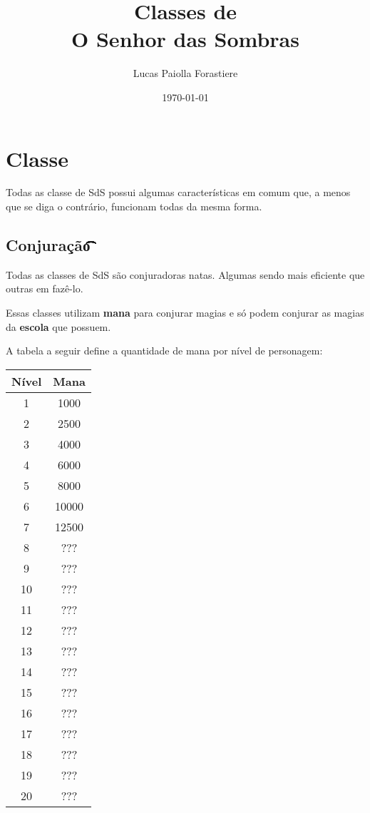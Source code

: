 \documentclass{RPG_Adventure}[2021/10/20]
\title{Classes de\\ \Huge{O Senhor das Sombras}}
\date{\today}
\author{Lucas Paiolla Forastiere}
\begin{document}
\maketitle
\tableofcontents
\newpage


\chapter{Classe}%
\label{cha:classe}

Todas as classe de SdS possui algumas características em comum que, a menos que
se diga o contrário, funcionam todas da mesma forma.

\section*{Conjuração\t\t\t\t\t\t\t\t\t\t\t}%
\label{sec:conjuracao}

Todas as classes de SdS são conjuradoras natas. Algumas sendo mais eficiente que
outras em fazê-lo.

Essas classes utilizam \textbf{mana} para conjurar magias e só podem conjurar as
magias da \textbf{escola} que possuem.

A tabela a seguir define a quantidade de mana por nível de personagem:

\begin{center}
\begin{tabular}{|||c||c|||}
    \hline
    \textbf{Nível} & \textbf{Mana} \\
    \hline
    \hline
    1 & 1000 \\
    \hline
    2 & 2500 \\
    \hline
    3 & 4000 \\
    \hline
    4 & 6000 \\
    \hline
    5 & 8000 \\
    \hline
    6 & 10000 \\
    \hline
    7 & 12500 \\
    \hline
    8 &  ??? \\
    \hline
    9 & ??? \\
    \hline
    10 & ??? \\
    \hline
    11 & ??? \\
    \hline
    12 & ??? \\
    \hline
    13 & ??? \\
    \hline
    14 & ??? \\
    \hline
    15 & ??? \\
    \hline
    16 & ??? \\
    \hline
    17 & ??? \\
    \hline
    18 & ??? \\
    \hline
    19 & ??? \\
    \hline
    20 & ??? \\
    \hline
\end{tabular}
\end{center}
\end{document}
